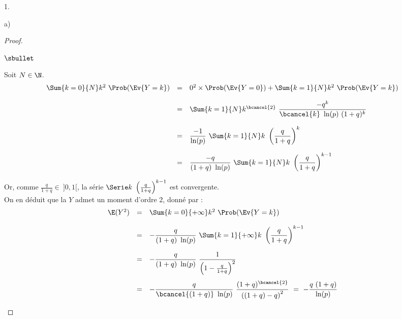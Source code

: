 \documentclass[11pt]{article}%
\begin{document}
\begin{noliste}{1.}
\begin{noliste}{a)}
\begin{proof}
\begin{noliste}{$\sbullet$}
      \item Soit $N \in \N$.
        \[
        \begin{array}{rcl}
          \Sum{k = 0}{N} k^2 \ \Prob(\Ev{Y = k}) & = & 0^2 \times
          \Prob(\Ev{Y = 0}) + \Sum{k = 1}{N} k^2 \ \Prob(\Ev{Y = k}) 
          \\[.4cm]
          & = & \Sum{k = 1}{N} k^{\bcancel{2}} \ \dfrac{-q^k}{\bcancel{k}
            \ \ln(p) \ (1+q)^k} 
          \\[.6cm]
          & = & \dfrac{-1}{\ln(p)} \ \Sum{k = 1}{N} k \ 
          \left(\dfrac{q}{1+q} \right)^k 
          \\[.6cm]
          & = & \dfrac{-q}{(1+q) \ \ln(p)} \ \Sum{k = 1}{N} k \ 
          \left(\dfrac{q}{1+q} \right)^{k-1} 
        \end{array}
        \]


        \newpage


      \item Or, comme $\frac{q}{1+q} \in \ ]0, 1[$, la série $\Serie k
        \ \left( \frac{q}{1+q} \right)^{k-1}$ est convergente.\\
        On en déduit que la \var $Y$ admet un moment d'ordre $2$,
        donné par :
        \[
        \begin{array}{rcl}
          \E(Y^2) & = & \Sum{k=0}{+\infty} k^2 \ \Prob(\Ev{Y = k}) 
          \\[.4cm]
          & = & -\dfrac{q}{(1+q) \ \ln(p)} \ \Sum{k=1}{+\infty} k \ \left(
            \dfrac{q}{1+q} \right)^{k-1} 
          \\[.6cm]
          & = & -\dfrac{q}{(1+q) \ \ln(p)} \ \dfrac{1}{\left( 1 -
              \frac{q}{1+q} \right)^2} 
          \\[.8cm]
          & = & -\dfrac{q}{\bcancel{(1+q)} \ \ln(p)} \ \dfrac{(1 +
            q)^{\bcancel{2}}}{\left( (1+q) - q \right)^2} 
          \ = \ - \dfrac{q \ (1+q)}{\ln(p)}
        \end{array}
        \]


\end{noliste}
\end{proof}
\end{noliste}
\end{noliste}
\end{document}
